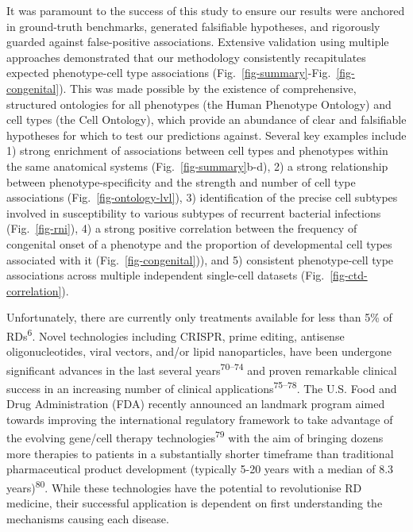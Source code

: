 \documentclass[
]{article}
\begin{document}
It was paramount to the success of this study to ensure our results were
anchored in ground-truth benchmarks, generated falsifiable hypotheses,
and rigorously guarded against false-positive associations. Extensive
validation using multiple approaches demonstrated that our methodology
consistently recapitulates expected phenotype-cell type associations
(Fig.~\ref{fig-summary}-Fig.~\ref{fig-congenital}). This was made
possible by the existence of comprehensive, structured ontologies for
all phenotypes (the Human Phenotype Ontology) and cell types (the Cell
Ontology), which provide an abundance of clear and falsifiable
hypotheses for which to test our predictions against. Several key
examples include 1) strong enrichment of associations between cell types
and phenotypes within the same anatomical systems
(Fig.~\ref{fig-summary}b-d), 2) a strong relationship between
phenotype-specificity and the strength and number of cell type
associations (Fig.~\ref{fig-ontology-lvl}), 3) identification of the
precise cell subtypes involved in susceptibility to various subtypes of
recurrent bacterial infections (Fig.~\ref{fig-rni}), 4) a strong
positive correlation between the frequency of congenital onset of a
phenotype and the proportion of developmental cell types associated with
it (Fig.~\ref{fig-congenital})), and 5) consistent phenotype-cell type
associations across multiple independent single-cell datasets
(Fig.~\ref{fig-ctd-correlation}).

Unfortunately, there are currently only treatments available for less
than 5\% of RDs\textsuperscript{6}. Novel technologies including CRISPR,
prime editing, antisense oligonucleotides, viral vectors, and/or lipid
nanoparticles, have been undergone significant advances in the last
several years\textsuperscript{70--74} and proven remarkable clinical
success in an increasing number of clinical
applications\textsuperscript{75--78}. The U.S. Food and Drug
Administration (FDA) recently announced an landmark program aimed
towards improving the international regulatory framework to take
advantage of the evolving gene/cell therapy
technologies\textsuperscript{79} with the aim of bringing dozens more
therapies to patients in a substantially shorter timeframe than
traditional pharmaceutical product development (typically 5-20 years
with a median of 8.3 years)\textsuperscript{80}. While these
technologies have the potential to revolutionise RD medicine, their
successful application is dependent on first understanding the
mechanisms causing each disease.
\end{document}

